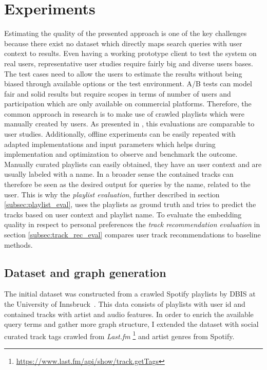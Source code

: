 \documentclass[sigconf]{acmart}
\begin{document}
\section{Experiments}
\label{sec:experiments}
Estimating the quality of the presented approach is one of the key challenges because there exist no dataset which directly maps search queries with user context to results. Even having a working prototype client to test the system on real users, representative user studies require fairly big and diverse users bases. The test cases need to allow the users to estimate the results without being biased through available options or the test environment. A/B tests can model fair and solid results but require scopes in terms of number of users and participation which are only available on commercial platforms. Therefore, the common approach in research is to make use of crawled playlists which were manually created by users. As presented in \cite{kamehkhosh2017user}, this evaluations are comparable to user studies. Additionally, offline experiments can be easily repeated with adapted implementations and input parameters which helps during implementation and optimization to observe and benchmark the outcome. \\

Manually curated playlists can easily obtained, they have an user context and are usually labeled with a name. In a broader sense the contained tracks can therefore be seen as the desired output for queries by the name, related to the user. This is why the \emph{playlist evaluation}, further described in section \ref{subsec:playlist_eval}, uses the playlists as ground truth and tries to predict the tracks based on user context and playlist name. To evaluate the embedding quality in respect to personal preferences the \emph{track recommendation evaluation} in section \ref{subsec:track_rec_eval} compares user track recommendations to baseline methods.


\subsection{Dataset and graph generation}
The initial dataset was constructed from a crawled Spotify playlists by DBIS at the University of Innsbruck~\cite{pichl2017improving}. This data consists of playlists with user id and contained tracks with artist and audio features. In order to enrich the available query terms and gather more graph structure, I extended the dataset with social curated track tags crawled from \emph{Last.fm} \footnote{\url{https://www.last.fm/api/show/track.getTags}} and artist genres from Spotify.
\end{document}
